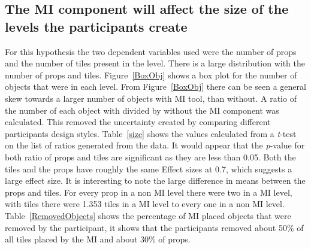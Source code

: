 \documentclass[journal]{IEEEtran}
\begin{document}
\subsection{The MI component will affect the size of the levels the participants create}\label{sizeSec}
For this hypothesis the two dependent variables used were the number of props and the number of tiles present in the level. There is a large distribution with the number of props and tiles. Figure~\ref{BoxObj} shows a box plot for the number of objects that were in each level. From Figure~\ref{BoxObj} there can be seen a general skew towards a larger number of objects with MI tool, than without. A ratio of the number of each object with divided by without the MI component was calculated. This removed the uncertainty created by comparing different participants design styles. Table~\ref{size} shows the values calculated from a \textit{t}-test on the list of ratios generated from the data. It would appear that the \textit{p}-value for both ratio of props and tiles are significant as they are less than 0.05. Both the tiles and the props have roughly the same Effect sizes at 0.7, which suggests a large  effect size\cite{cohen1988statistical}. It is interesting to note the large difference in means between the props and tiles. For every prop in a non MI level there were two in a MI level, with tiles there were 1.353 tiles in a MI level to every one in a non MI level. Table~\ref{RemovedObjects} shows the percentage of MI placed objects that were removed by the participant, it shows that the participants removed about 50\% of all tiles placed by the MI and about 30\% of props.
\end{document}

